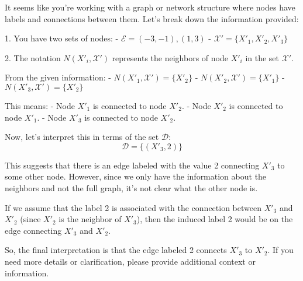 It seems like you're working with a graph or network structure where nodes have labels and connections between them. Let's break down the information provided:

1. You have two sets of nodes:
   - \( \mathcal{E} = (-3, -1), (1, 3) \)
   - \( \mathcal{X}' = \{ X'_1, X'_2, X'_3 \} \)

2. The notation \( N(X'_i, \mathcal{X}') \) represents the neighbors of node \( X'_i \) in the set \( \mathcal{X}' \).

From the given information:
- \( N(X'_1, \mathcal{X}') = \{ X'_2 \} \)
- \( N(X'_2, \mathcal{X}') = \{ X'_1 \} \)
- \( N(X'_3, \mathcal{X}') = \{ X'_2 \} \)

This means:
- Node \( X'_1 \) is connected to node \( X'_2 \).
- Node \( X'_2 \) is connected to node \( X'_1 \).
- Node \( X'_3 \) is connected to node \( X'_2 \).

Now, let's interpret this in terms of the set \( \mathcal{D} \):
\[ \mathcal{D} = \{(X'_3, 2)\} \]

This suggests that there is an edge labeled with the value 2 connecting \( X'_3 \) to some other node. However, since we only have the information about the neighbors and not the full graph, it's not clear what the other node is.

If we assume that the label 2 is associated with the connection between \( X'_3 \) and \( X'_2 \) (since \( X'_2 \) is the neighbor of \( X'_3 \)), then the induced label 2 would be on the edge connecting \( X'_3 \) and \( X'_2 \).

So, the final interpretation is that the edge labeled 2 connects \( X'_3 \) to \( X'_2 \). If you need more details or clarification, please provide additional context or information.